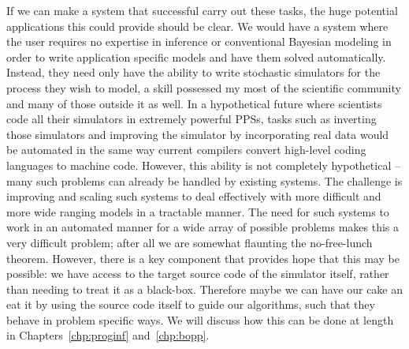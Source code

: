 If we can make a system that successful carry out these tasks, 
the huge potential applications this could provide should be clear. We would have a 
system where the user requires no expertise in inference or conventional
Bayesian modeling in order to write application specific models and have them solved automatically.
Instead, they need only have the ability to write stochastic simulators for the process they wish to
model, a skill possessed my most of the scientific community and many of those outside it as well.
In a hypothetical future where scientists
code all their simulators in extremely powerful PPSs, tasks such as
inverting those simulators and improving the simulator by incorporating real data would
be automated in the same way current compilers convert high-level coding languages to machine code.  
However, this ability is not completely
hypothetical -- many such problems can already be handled by existing systems.  The challenge
is improving and scaling such systems to deal effectively with more difficult and more wide ranging models
in a tractable manner.  The need for such systems to work in an automated manner for a wide array
of possible problems makes this a very difficult problem; after all we are somewhat flaunting the no-free-lunch
theorem.  However, there is a key component that provides hope that this may be possible: we have access
to the target source code of the simulator itself, rather than needing to treat it as a black-box.  Therefore
maybe we can have our cake an eat it by using the source code itself to guide our algorithms, such that
they behave in problem specific ways.  We will discuss how this can be done at length in 
Chapters~\ref{chp:proginf} and~\ref{chp:bopp}.

